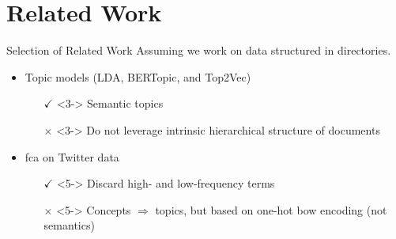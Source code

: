 \section{Related Work}

\begin{frame}{Selection of Related Work}
    Assuming we work on data structured in directories.
    \begin{itemize}
        \item<2-> Topic models (LDA, BERTopic, and Top2Vec)
        \begin{itemize}
            \item[$\checkmark$]<3-> Semantic topics
            \item[$\times$]<3-> Do not leverage intrinsic hierarchical structure of documents
        \end{itemize}

        \item<4-> \acs{fca} on Twitter data~\parencite{twitter_fca_2016}
        \begin{itemize}
            \item[$\checkmark$]<5-> Discard high- and low-frequency terms
            \item[$\times$]<5-> Concepts $\Rightarrow$ topics, but based on one-hot \ac{bow} encoding (not semantics)
        \end{itemize}
      
    \end{itemize}
\end{frame}



